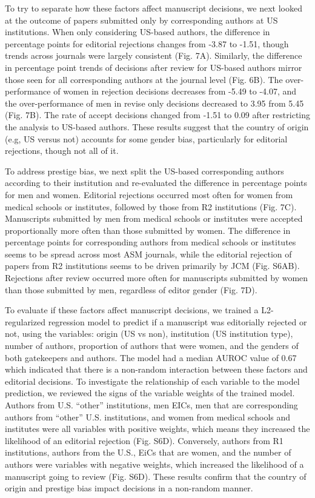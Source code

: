 \documentclass[11pt,]{article}
\begin{document}
To try to separate how these factors affect manuscript decisions, we
next looked at the outcome of papers submitted only by corresponding
authors at US institutions. When only considering US-based authors, the
difference in percentage points for editorial rejections changes from
-3.87 to -1.51, though trends across journals were largely consistent
(Fig. 7A). Similarly, the difference in percentage point trends of
decisions after review for US-based authors mirror those seen for all
corresponding authors at the journal level (Fig. 6B). The
over-performance of women in rejection decisions decreases from -5.49 to
-4.07, and the over-performance of men in revise only decisions
decreased to 3.95 from 5.45 (Fig. 7B). The rate of accept decisions
changed from -1.51 to 0.09 after restricting the analysis to US-based
authors. These results suggest that the country of origin (e.g, US
versus not) accounts for some gender bias, particularly for editorial
rejections, though not all of it.

To address prestige bias, we next split the US-based corresponding
authors according to their institution and re-evaluated the difference
in percentage points for men and women. Editorial rejections occurred
most often for women from medical schools or institutes, followed by
those from R2 institutions (Fig. 7C). Manuscripts submitted by men from
medical schools or institutes were accepted proportionally more often
than those submitted by women. The difference in percentage points for
corresponding authors from medical schools or institutes seems to be
spread across most ASM journals, while the editorial rejection of papers
from R2 institutions seems to be driven primarily by JCM (Fig. S6AB).
Rejections after review occurred more often for manuscripts submitted by
women than those submitted by men, regardless of editor gender (Fig.
7D).

To evaluate if these factors affect manuscript decisions, we trained a
L2-regularized regression model to predict if a manuscript was
editorially rejected or not, using the variables: origin (US vs non),
institution (US institution type), number of authors, proportion of
authors that were women, and the genders of both gatekeepers and
authors. The model had a median AUROC value of 0.67 which indicated that
there is a non-random interaction between these factors and editorial
decisions. To investigate the relationship of each variable to the model
prediction, we reviewed the signs of the variable weights of the trained
model. Authors from U.S. ``other'' institutions, men EICs, men that are
corresponding authors from ``other'' U.S. institutions, and women from
medical schools and institutes were all variables with positive weights,
which means they increased the likelihood of an editorial rejection
(Fig. S6D). Conversely, authors from R1 institutions, authors from the
U.S., EiCs that are women, and the number of authors were variables with
negative weights, which increased the likelihood of a manuscript going
to review (Fig. S6D). These results confirm that the country of origin
and prestige bias impact decisions in a non-random manner.
\end{document}

